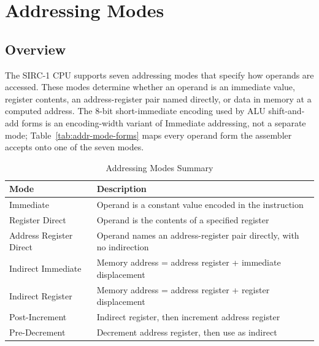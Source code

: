 \chapter{Addressing Modes}
\label{ch:addressing-modes}

\section{Overview}

The SIRC-1 CPU supports seven addressing modes that specify how operands are accessed. These modes determine whether an
operand is an immediate value, register contents, an address-register pair named directly, or data in memory at a
computed address. The 8-bit short-immediate encoding used by ALU shift-and-add forms is an encoding-width variant of
Immediate addressing, not a separate mode; Table~\ref{tab:addr-mode-forms} maps every operand form the assembler
accepts onto one of the seven modes.

\begin{table}[H]
	\centering
	\begin{tabular}{lp{8cm}}
		\toprule
		\textbf{Mode}           & \textbf{Description}                                                 \\
		\midrule
		Immediate               & Operand is a constant value encoded in the instruction               \\
		Register Direct         & Operand is the contents of a specified register                      \\
		Address Register Direct & Operand names an address-register pair directly, with no indirection \\
		Indirect Immediate      & Memory address = address register + immediate displacement           \\
		Indirect Register       & Memory address = address register + register displacement            \\
		Post-Increment          & Indirect register, then increment address register                   \\
		Pre-Decrement           & Decrement address register, then use as indirect                     \\
		\bottomrule
	\end{tabular}
	\caption{Addressing Modes Summary}
	\label{tab:addr-modes}
\end{table}


